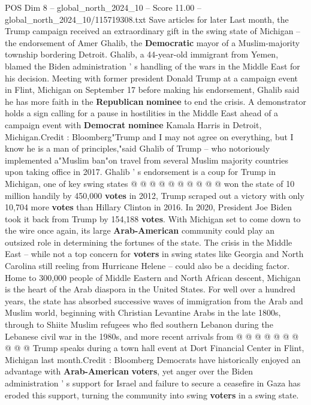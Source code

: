 \begin{textsample}{POS Dim 8 – global\_north\_2024\_10 – Score 11.00 – global\_north\_2024\_10/115719308.txt}  \label{ex:f8_pos_168}
Save articles for later Last month, the Trump campaign received an extraordinary gift in the swing state of Michigan -- the endorsement of Amer Ghalib, the \textbf{Democratic} mayor of a Muslim-majority township bordering Detroit.
Ghalib, a 44-year-old immigrant from Yemen, blamed the Biden administration ' s handling of the wars in the Middle East for his decision.
Meeting with former president Donald Trump at a campaign event in Flint, Michigan on September 17 before making his endorsement, Ghalib said he has more faith in the \textbf{Republican} \textbf{nominee} to end the crisis.
A demonstrator holds a sign calling for a pause in hostilities in the Middle East ahead of a campaign event with \textbf{Democrat} \textbf{nominee} Kamala Harris in Detroit, Michigan.Credit : Bloomberg"Trump and I may not agree on everything, but I know he is a man of principles,"said Ghalib of Trump -- who notoriously implemented a"Muslim ban"on travel from several Muslim majority countries upon taking office in 2017.
Ghalib ' s endorsement is a coup for Trump in Michigan, one of key swing states @ @ @ @ @ @ @ @ @ @ won the state of 10 million handily by 450,000 \textbf{votes} in 2012, Trump scraped out a victory with only 10,704 more \textbf{votes} than Hillary Clinton in 2016.
In 2020, President Joe Biden took it back from Trump by 154,188 \textbf{votes}.
With Michigan set to come down to the wire once again, its large \textbf{Arab-American} community could play an outsized role in determining the fortunes of the state.
The crisis in the Middle East -- while not a top concern for \textbf{voters} in swing states like Georgia and North Carolina still reeling from Hurricane Helene -- could also be a deciding factor.
Home to 300,000 people of Middle Eastern and North African descent, Michigan is the heart of the Arab diaspora in the United States.
For well over a hundred years, the state has absorbed successive waves of immigration from the Arab and Muslim world, beginning with Christian Levantine Arabs in the late 1800s, through to Shiite Muslim refugees who fled southern Lebanon during the Lebanese civil war in the 1980s, and more recent arrivals from @ @ @ @ @ @ @ @ @ @ Trump speaks during a town hall event at Dort Financial Center in Flint, Michigan last month.Credit : Bloomberg Democrats have historically enjoyed an advantage with \textbf{Arab-American} \textbf{voters}, yet anger over the Biden administration ' s support for Israel and failure to secure a ceasefire in Gaza has eroded this support, turning the community into swing \textbf{voters} in a swing state.

\end{textsample}
